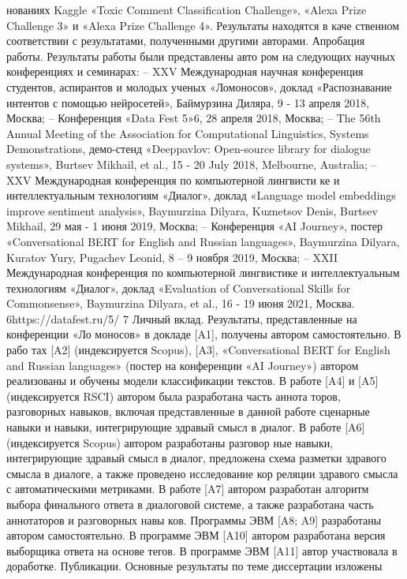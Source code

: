 нованиях Kaggle «Toxic Comment Classification Challenge», «Alexa Prize
Challenge 3» и «Alexa Prize Challenge 4». Результаты находятся в каче
ственном соответствии с результатами, полученными другими авторами.
Апробация работы. Результаты работы были представлены авто
ром на следующих научных конференциях и семинарах:
– XXV Международная научная конференция студентов, аспирантов
и молодых ученых «Ломоносов», доклад «Распознавание интентов
с помощью нейросетей», Баймурзина Диляра, 9 - 13 апреля 2018,
Москва;
– Конференция «Data Fest 5»6, 28 апреля 2018, Москва;
– The 56th Annual Meeting of the Association for Computational
Linguistics, Systems Demonstrations, демо-стенд «Deeppavlov:
Open-source library for dialogue systems», Burtsev Mikhail, et al.,
15 - 20 July 2018, Melbourne, Australia;
– XXV Международная конференция по компьютерной лингвисти
ке и интеллектуальным технологиям «Диалог», доклад «Language
model embeddings improve sentiment analysis», Baymurzina Dilyara,
Kuznetsov Denis, Burtsev Mikhail, 29 мая - 1 июня 2019, Москва;
– Конференция «AI Journey», постер «Conversational BERT for
English and Russian languages», Baymurzina Dilyara, Kuratov Yury,
Pugachev Leonid, 8 – 9 ноября 2019, Москва;
– XXII Международная конференция по компьютерной лингвистике
и интеллектуальным технологиям «Диалог», доклад «Evaluation of
Conversational Skills for Commonsense», Baymurzina Dilyara, et al.,
16 - 19 июня 2021, Москва.
6https://datafest.ru/5/
7
Личный вклад. Результаты, представленные на конференции «Ло
моносов» в докладе [A1], получены автором самостоятельно. В рабо
тах [A2] (индексируется Scopus), [A3], «Conversational BERT for English
and Russian languages» (постер на конференции «AI Journey») автором
реализованы и обучены модели классификации текстов. В работе [A4]
и [A5] (индексируется RSCI) автором была разработана часть аннота
торов, разговорных навыков, включая представленные в данной работе
сценарные навыки и навыки, интегрирующие здравый смысл в диалог.
В работе [A6] (индексируется Scopus) автором разработаны разговор
ные навыки, интегрирующие здравый смысл в диалог, предложена схема
разметки здравого смысла в диалоге, а также проведено исследование кор
реляции здравого смысла с автоматическими метриками. В работе [A7]
автором разработан алгоритм выбора финального ответа в диалоговой
системе, а также разработана часть аннотаторов и разговорных навы
ков. Программы ЭВМ [A8; A9] разработаны автором самостоятельно. В
программе ЭВМ [A10] автором разработана версия выборщика ответа на
основе тегов. В программе ЭВМ [A11] автор участвовала в доработке.
Публикации. Основные результаты по теме диссертации изложены

